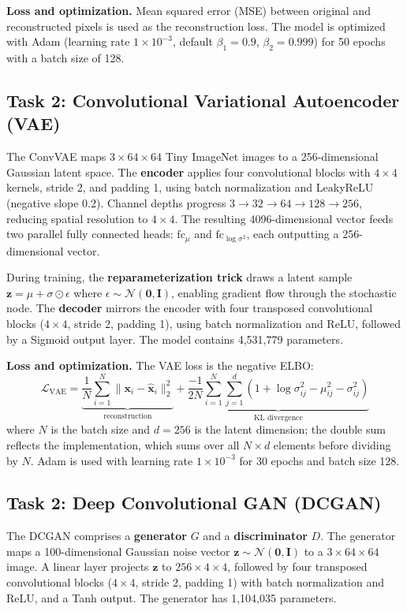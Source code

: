 \documentclass[12pt]{article}
\begin{document}
\textbf{Loss and optimization.} Mean squared error (MSE) between original and reconstructed pixels is used as the reconstruction loss. The model is optimized with Adam (learning rate $1\times10^{-3}$, default $\beta_1=0.9$, $\beta_2=0.999$) for 50 epochs with a batch size of 128.

\subsection{Task 2: Convolutional Variational Autoencoder (VAE)}

The ConvVAE maps $3\times64\times64$ Tiny ImageNet images to a 256-dimensional Gaussian latent space. The \textbf{encoder} applies four convolutional blocks with $4\times4$ kernels, stride 2, and padding 1, using batch normalization and LeakyReLU (negative slope 0.2). Channel depths progress $3\to32\to64\to128\to256$, reducing spatial resolution to $4\times4$. The resulting 4096-dimensional vector feeds two parallel fully connected heads: $\text{fc}_\mu$ and $\text{fc}_{\log\sigma^2}$, each outputting a 256-dimensional vector.

During training, the \textbf{reparameterization trick} draws a latent sample $\mathbf{z} = \mu + \sigma \odot \epsilon$ where $\epsilon \sim \mathcal{N}(\mathbf{0}, \mathbf{I})$, enabling gradient flow through the stochastic node. The \textbf{decoder} mirrors the encoder with four transposed convolutional blocks ($4\times4$, stride 2, padding 1), using batch normalization and ReLU, followed by a Sigmoid output layer. The model contains 4,531,779 parameters.

\textbf{Loss and optimization.} The VAE loss is the negative ELBO:
\[
\mathcal{L}_{\text{VAE}} = \underbrace{\frac{1}{N}\sum_{i=1}^{N} \|\mathbf{x}_i - \hat{\mathbf{x}}_i\|_2^2}_{\text{reconstruction}} + \underbrace{\frac{-1}{2N}\sum_{i=1}^{N}\sum_{j=1}^{d} \left(1 + \log\sigma_{ij}^2 - \mu_{ij}^2 - \sigma_{ij}^2\right)}_{\text{KL divergence}}
\]
where $N$ is the batch size and $d=256$ is the latent dimension; the double sum reflects the implementation, which sums over all $N \times d$ elements before dividing by $N$. Adam is used with learning rate $1\times10^{-3}$ for 30 epochs and batch size 128.

\subsection{Task 2: Deep Convolutional GAN (DCGAN)}

The DCGAN comprises a \textbf{generator} $G$ and a \textbf{discriminator} $D$. The generator maps a 100-dimensional Gaussian noise vector $\mathbf{z} \sim \mathcal{N}(\mathbf{0}, \mathbf{I})$ to a $3\times64\times64$ image. A linear layer projects $\mathbf{z}$ to $256\times4\times4$, followed by four transposed convolutional blocks ($4\times4$, stride 2, padding 1) with batch normalization and ReLU, and a Tanh output. The generator has 1,104,035 parameters.
\end{document}

